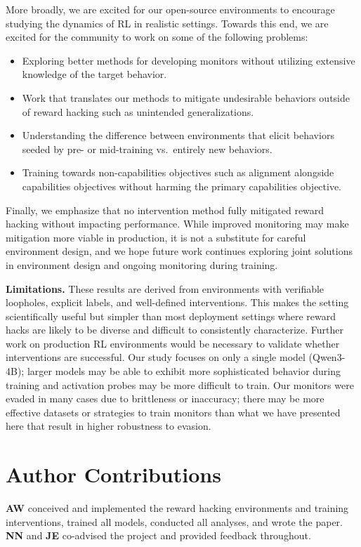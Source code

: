 \documentclass{article}
\begin{document}
More broadly, we are excited for our open-source environments to encourage studying the dynamics of RL in realistic settings. Towards this end, we are excited for the community to work on some of the following problems:
\begin{itemize}[leftmargin=1em]
    \item Exploring better methods for developing monitors without utilizing extensive knowledge of the target behavior.
    \item Work that translates our methods to mitigate undesirable behaviors outside of reward hacking such as unintended generalizations.
    \item Understanding the difference between environments that elicit behaviors seeded by pre- or mid-training vs.\ entirely new behaviors.
    \item Training towards non-capabilities objectives such as alignment alongside capabilities objectives without harming the primary capabilities objective.
\end{itemize}
Finally, we emphasize that no intervention method fully mitigated reward hacking without impacting performance. While improved monitoring may make mitigation more viable in production, it is not a substitute for careful environment design, and we hope future work continues exploring joint solutions in environment design and ongoing monitoring during training.

\textbf{Limitations.} These results are derived from environments with verifiable loopholes, explicit labels, and well-defined interventions. This makes the setting scientifically useful but simpler than most deployment settings where reward hacks are likely to be diverse and difficult to consistently characterize. Further work on production RL environments would be necessary to validate whether interventions are successful. Our study focuses on only a single model (Qwen3-4B); larger models may be able to exhibit more sophisticated behavior during training and activation probes may be more difficult to train. Our monitors were evaded in many cases due to brittleness or inaccuracy; there may be more effective datasets or strategies to train monitors than what we have presented here that result in higher robustness to evasion. 


\section*{Author Contributions}

\textbf{AW} conceived and implemented the reward hacking environments and training interventions, trained all models, conducted all analyses, and wrote the paper. \textbf{NN} and \textbf{JE} co-advised the project and provided feedback throughout.
\end{document}
